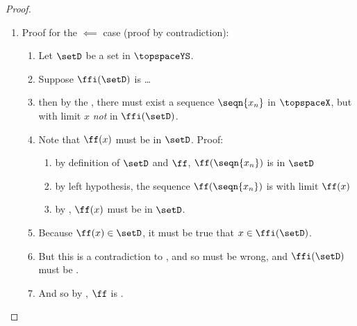 \begin{proof}
\begin{enumerate}
  \item Proof for the $\impliedby$ case (proof by contradiction):
    \begin{enumerate}
      \item Let $\setD$ be a  set in $\topspaceYS$.
      \item Suppose $\ffi(\setD)$ is \ldots \label{item:limcont_suppose}
      \item then by the  , there must exist 
            a  sequence $\seqn{x_n}$ in $\topspaceX$, 
            but with limit $x$ \emph{not} in $\ffi(\setD)$. \label{item:limcont_x}
      \item Note that $\ff(x)$ must be in $\setD$. Proof:
        \begin{enumerate}
          \item by definition of $\setD$ and $\ff$, $\ff(\seqn{x_n})$ is in $\setD$
          \item by left hypothesis, the sequence $\ff(\seqn{x_n})$ is  with limit $\ff(x)$
          \item by  , $\ff(x)$ must be in $\setD$.
        \end{enumerate}
      \item Because $\ff(x)\in\setD$, it must be true that $x\in\ffi(\setD)$.
      \item But this is a contradiction to , 
            and so  must be wrong, and $\ffi(\setD)$ must be .
      \item And so by , $\ff$ is .
    \end{enumerate}
  \end{enumerate}
\end{proof}

